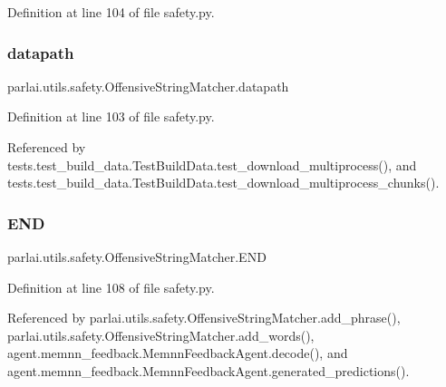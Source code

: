 Definition at line 104 of file safety.\+py.

\mbox{\label{classparlai_1_1utils_1_1safety_1_1OffensiveStringMatcher_a8c7a5276c0d2ed281a19bbcbcee3b8af}} 
\subsubsection{\texorpdfstring{datapath}{datapath}}
{\footnotesize\ttfamily parlai.\+utils.\+safety.\+Offensive\+String\+Matcher.\+datapath}



Definition at line 103 of file safety.\+py.



Referenced by tests.\+test\+\_\+build\+\_\+data.\+Test\+Build\+Data.\+test\+\_\+download\+\_\+multiprocess(), and tests.\+test\+\_\+build\+\_\+data.\+Test\+Build\+Data.\+test\+\_\+download\+\_\+multiprocess\+\_\+chunks().

\mbox{\label{classparlai_1_1utils_1_1safety_1_1OffensiveStringMatcher_a50a8ff283ddb837060366bba52d8136c}} 
\subsubsection{\texorpdfstring{E\+ND}{END}}
{\footnotesize\ttfamily parlai.\+utils.\+safety.\+Offensive\+String\+Matcher.\+E\+ND}



Definition at line 108 of file safety.\+py.



Referenced by parlai.\+utils.\+safety.\+Offensive\+String\+Matcher.\+add\+\_\+phrase(), parlai.\+utils.\+safety.\+Offensive\+String\+Matcher.\+add\+\_\+words(), agent.\+memnn\+\_\+feedback.\+Memnn\+Feedback\+Agent.\+decode(), and agent.\+memnn\+\_\+feedback.\+Memnn\+Feedback\+Agent.\+generated\+\_\+predictions().

